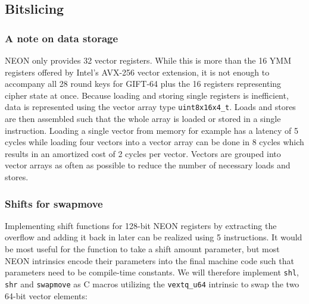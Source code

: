 



\subsection{Bitslicing}

\subsubsection{A note on data storage}

NEON only provides 32 vector registers. While this is more than the 16 YMM
registers offered by Intel's AVX-256 vector extension, it is not enough to
accompany all 28 round keys for GIFT-64 plus the 16 registers representing
cipher state at once. Because loading and storing single registers is
inefficient, data is represented using the vector array type
\texttt{uint8x16x4\_t}. Loads and stores are then assembled such that the whole
array is loaded or stored in a single instruction. Loading a single vector from
memory for example has a latency of 5 cycles while loading four vectors into a
vector array can be done in 8 cycles which results in an amortized cost of 2
cycles per vector. Vectors are grouped into vector arrays as often as possible
to reduce the number of necessary loads and stores.

\subsubsection{Shifts for swapmove}

Implementing shift functions for 128-bit NEON registers by extracting the
overflow and adding it back in later can be realized using 5 instructions. It
would be most useful for the function to take a shift amount parameter, but
most NEON intrinsics encode their parameters into the final machine code such
that parameters need to be compile-time constants. We will therefore implement
\texttt{shl}, \texttt{shr} and \texttt{swapmove} as C macros utilizing the
\texttt{vextq\_u64} intrinsic to swap the two 64-bit vector elements:



